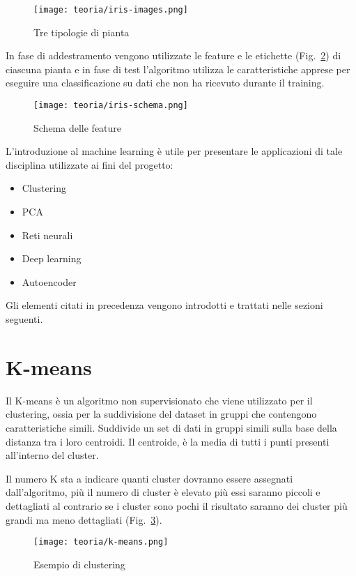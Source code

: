 \begin{figure}[!h] 
    \centering 
    \texttt{[image: teoria/iris-images.png]} 
    \caption{Tre tipologie di pianta}
    \label{fig:iris-images}
  \end{figure}

In fase di addestramento vengono utilizzate le feature e le etichette (Fig.~\ref{fig:iris-schema}) di ciascuna pianta e in fase di test l'algoritmo utilizza le caratteristiche apprese per eseguire una classificazione su dati che non ha ricevuto durante il training.

\begin{figure}[!h] 
    \centering 
    \texttt{[image: teoria/iris-schema.png]} 
    \caption{Schema delle feature}
    \label{fig:iris-schema}
  \end{figure}

L'introduzione al machine learning è utile per presentare le applicazioni di tale disciplina utilizzate ai fini del progetto:
\begin{itemize}
    \item Clustering
    \item PCA
    \item Reti neurali
    \item Deep learning
    \item Autoencoder
\end{itemize}
Gli elementi citati in precedenza vengono introdotti e trattati nelle sezioni seguenti.

\newpage

\section{K-means}
Il K-means è un algoritmo non supervisionato che viene utilizzato per il clustering, ossia per la suddivisione del dataset in gruppi che contengono caratteristiche simili.
Suddivide un set di dati in gruppi simili sulla base della distanza tra i loro centroidi. 
Il centroide, è la media di tutti i punti presenti all'interno del cluster.

Il numero K sta a indicare quanti cluster dovranno essere assegnati dall'algoritmo, più il numero di cluster è elevato più essi saranno piccoli e dettagliati al contrario se i cluster sono pochi il risultato saranno dei cluster più grandi ma meno dettagliati (Fig.~\ref{fig:k-means}).

\begin{figure}[!h] 
    \centering 
    \texttt{[image: teoria/k-means.png]} 
    \caption{Esempio di clustering}
    \label{fig:k-means}
  \end{figure}


